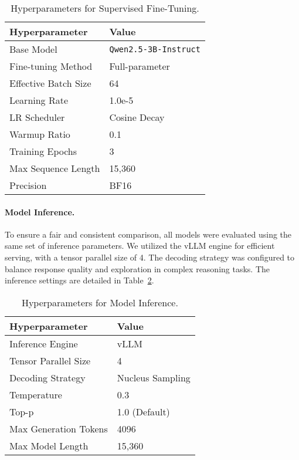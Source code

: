 \begin{table}[!h]
\centering
\begin{tabular}{@{}ll@{}}
\toprule
\textbf{Hyperparameter} & \textbf{Value} \\
\midrule
Base Model & \texttt{Qwen2.5-3B-Instruct} \\
Fine-tuning Method & Full-parameter \\
Effective Batch Size & 64 \\
Learning Rate & 1.0e-5 \\
LR Scheduler & Cosine Decay \\
Warmup Ratio & 0.1 \\
Training Epochs & 3 \\
Max Sequence Length & 15,360 \\
Precision & BF16 \\
\bottomrule
\end{tabular}
\caption{Hyperparameters for Supervised Fine-Tuning.}
\label{tab:sft_hyperparameters}
\end{table}

\paragraph{Model Inference.}
To ensure a fair and consistent comparison, all models were evaluated using the same set of inference parameters. We utilized the vLLM engine for efficient serving, with a tensor parallel size of 4. The decoding strategy was configured to balance response quality and exploration in complex reasoning tasks. The inference settings are detailed in Table~\ref{tab:inference_hyperparameters}.

\begin{table}[!h]
\centering
\begin{tabular}{@{}ll@{}}
\toprule
\textbf{Hyperparameter} & \textbf{Value} \\
\midrule
Inference Engine & vLLM \\
Tensor Parallel Size & 4 \\
Decoding Strategy & Nucleus Sampling \\
Temperature & 0.3 \\
Top-p & 1.0 (Default) \\
Max Generation Tokens & 4096 \\
Max Model Length & 15,360 \\
\bottomrule
\end{tabular}
\caption{Hyperparameters for Model Inference.}
\label{tab:inference_hyperparameters}
\end{table}



 